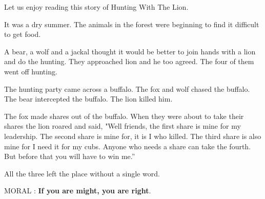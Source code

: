 Let us enjoy reading this story of Hunting With The Lion. 

It was a dry summer. The animals in the forest were beginning to find it difficult to get food. 

A bear, a wolf and a jackal thought it would be better to join hands with a lion and do the hunting. They approached lion and he too agreed. The four of them went off hunting. 

The hunting party came across a buffalo. The fox and wolf chased the buffalo. The bear intercepted the buffalo. The lion killed him. 

The fox made shares out of the buffalo. When they were about to take their shares the lion roared and said, "Well friends, the first share is mine for my leadership. The second share is mine for, it is I who killed. The third share is also mine for I need it for my cubs. Anyone who needs a share can take the fourth. But before that you will have to win me.” 

All the three left the place without a single word. 

MORAL : {\bf If you are might, you are right}.